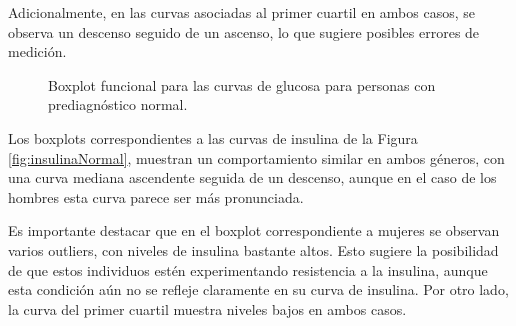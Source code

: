 Adicionalmente, en las curvas asociadas al primer cuartil en ambos casos, se observa un descenso seguido de un ascenso, lo que sugiere posibles errores de medición.


\begin{figure}[H]
 \centering
    \caption{Boxplot funcional para las curvas de glucosa para personas con prediagnóstico normal.}
    \label{fig:glucosaNormal}
\end{figure}

Los boxplots correspondientes a las curvas de insulina de la Figura \ref{fig:insulinaNormal}, muestran un comportamiento similar en ambos géneros, con una curva mediana ascendente seguida de un descenso, aunque en el caso de los hombres esta curva parece ser más pronunciada.

Es importante destacar que en el boxplot correspondiente a mujeres se observan varios outliers, con niveles de insulina bastante altos. Esto sugiere la posibilidad de que estos individuos estén experimentando resistencia a la insulina, aunque esta condición aún no se refleje claramente en su curva de insulina. Por otro lado, la curva del primer cuartil muestra niveles bajos en ambos casos.

